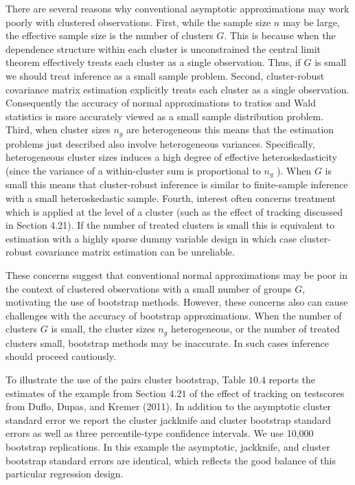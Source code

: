 \documentclass[10pt]{article}
\begin{document}
There are several reasons why conventional asymptotic approximations may work poorly with clustered observations. First, while the sample size $n$ may be large, the effective sample size is the number of clusters $G$. This is because when the dependence structure within each cluster is unconstrained the central limit theorem effectively treats each cluster as a single observation. Thus, if $G$ is small we should treat inference as a small sample problem. Second, cluster-robust covariance matrix estimation explicitly treats each cluster as a single observation. Consequently the accuracy of normal approximations to tratios and Wald statistics is more accurately viewed as a small sample distribution problem. Third, when cluster sizes $n_{g}$ are heterogeneous this means that the estimation problems just described also involve heterogeneous variances. Specifically, heterogeneous cluster sizes induces a high degree of effective heteroskedasticity (since the variance of a within-cluster sum is proportional to $n_{g}$ ). When $G$ is small this means that cluster-robust inference is similar to finite-sample inference with a small heteroskedastic sample. Fourth, interest often concerns treatment which is applied at the level of a cluster (such as the effect of tracking discussed in Section 4.21). If the number of treated clusters is small this is equivalent to estimation with a highly sparse dummy variable design in which case cluster-robust covariance matrix estimation can be unreliable.

These concerns suggest that conventional normal approximations may be poor in the context of clustered observations with a small number of groups $G$, motivating the use of bootstrap methods. However, these concerns also can cause challenges with the accuracy of bootstrap approximations. When the number of clusters $G$ is small, the cluster sizes $n_{g}$ heterogeneous, or the number of treated clusters small, bootstrap methods may be inaccurate. In such cases inference should proceed cautiously.

To illustrate the use of the pairs cluster bootstrap, Table $10.4$ reports the estimates of the example from Section $4.21$ of the effect of tracking on testscores from Duflo, Dupas, and Kremer (2011). In addition to the asymptotic cluster standard error we report the cluster jackknife and cluster bootstrap standard errors as well as three percentile-type confidence intervals. We use 10,000 bootstrap replications. In this example the asymptotic, jackknife, and cluster bootstrap standard errors are identical, which reflects the good balance of this particular regression design.
\end{document}
